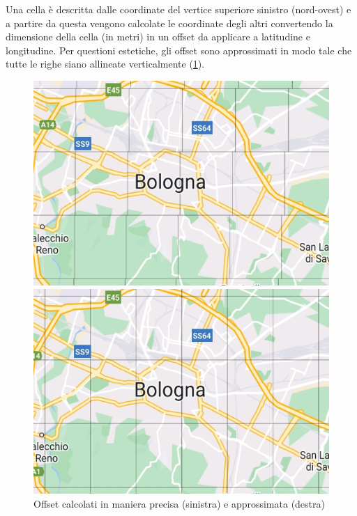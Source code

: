 \documentclass[11pt]{article}
\begin{document}
Una cella è descritta dalle coordinate del vertice superiore sinistro (nord-ovest) e a partire da questa vengono calcolate le coordinate degli altri convertendo la dimensione della cella (in metri) in un offset da applicare a latitudine e longitudine.
Per questioni estetiche, gli offset sono approssimati in modo tale che tutte le righe siano allineate verticalmente (\cref{fig:tile_offset}).
\begin{figure}[h]
    \centering
    \begin{minipage}[b]{0.45\textwidth}
      \includegraphics[width=\textwidth]{./img/tile_no_approx.jpg}
    \end{minipage}
    \hfill
    \begin{minipage}[b]{0.45\textwidth}
      \includegraphics[width=\textwidth]{./img/tile_approx.jpg}
    \end{minipage}
    \caption{Offset calcolati in maniera precisa (sinistra) e approssimata (destra)} \label{fig:tile_offset}
\end{figure}
\end{document}
